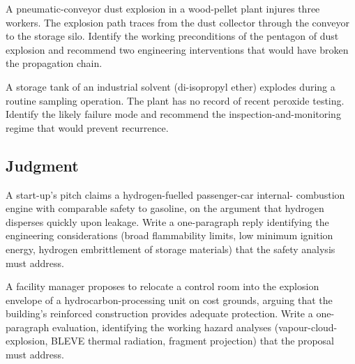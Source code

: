 \begin{exercise}
A pneumatic-conveyor dust explosion in a wood-pellet plant injures
three workers. The explosion path traces from the dust collector
through the conveyor to the storage silo. Identify the working
preconditions of the pentagon of dust explosion and recommend two
engineering interventions that would have broken the propagation
chain.
\end{exercise}

\begin{exercise}
A storage tank of an industrial solvent (di-isopropyl ether) explodes
during a routine sampling operation. The plant has no record of recent
peroxide testing. Identify the likely failure mode and recommend the
inspection-and-monitoring regime that would prevent recurrence.
\end{exercise}

\subsection*{Judgment}

\begin{exercise}
A start-up's pitch claims a hydrogen-fuelled passenger-car internal-
combustion engine with comparable safety to gasoline, on the argument
that hydrogen disperses quickly upon leakage. Write a one-paragraph
reply identifying the engineering considerations (broad flammability
limits, low minimum ignition energy, hydrogen embrittlement of
storage materials) that the safety analysis must address.
\end{exercise}

\begin{exercise}
A facility manager proposes to relocate a control room into the
explosion envelope of a hydrocarbon-processing unit on cost grounds,
arguing that the building's reinforced construction provides adequate
protection. Write a one-paragraph evaluation, identifying the
working hazard analyses (vapour-cloud-explosion, BLEVE thermal
radiation, fragment projection) that the proposal must address.
\end{exercise}
